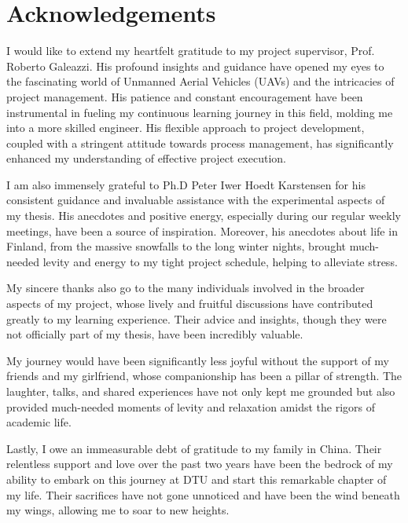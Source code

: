 \section*{Acknowledgements}

I would like to extend my heartfelt gratitude to my project supervisor, Prof. Roberto Galeazzi. His profound insights and guidance have opened my eyes to the fascinating world of Unmanned Aerial Vehicles (UAVs) and the intricacies of project management. His patience and constant encouragement have been instrumental in fueling my continuous learning journey in this field, molding me into a more skilled engineer. His flexible approach to project development, coupled with a stringent attitude towards process management, has significantly enhanced my understanding of effective project execution.

I am also immensely grateful to Ph.D Peter Iwer Hoedt Karstensen for his consistent guidance and invaluable assistance with the experimental aspects of my thesis. His anecdotes and positive energy, especially during our regular weekly meetings, have been a source of inspiration. Moreover, his anecdotes about life in Finland, from the massive snowfalls to the long winter nights, brought much-needed levity and energy to my tight project schedule, helping to alleviate stress.

My sincere thanks also go to the many individuals involved in the broader aspects of my project, whose lively and fruitful discussions have contributed greatly to my learning experience. Their advice and insights, though they were not officially part of my thesis, have been incredibly valuable.

My journey would have been significantly less joyful without the support of my friends and my girlfriend, whose companionship has been a pillar of strength. The laughter, talks, and shared experiences have not only kept me grounded but also provided much-needed moments of levity and relaxation amidst the rigors of academic life.

Lastly, I owe an immeasurable debt of gratitude to my family in China. Their relentless support and love over the past two years have been the bedrock of my ability to embark on this journey at DTU and start this remarkable chapter of my life. Their sacrifices have not gone unnoticed and have been the wind beneath my wings, allowing me to soar to new heights.